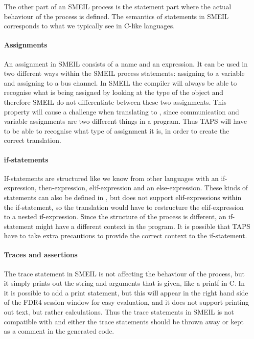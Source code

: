 The other part of an SMEIL process is the statement part where the actual behaviour of the process is defined. The semantics of statements in SMEIL corresponds to what we typically see in C-like languages.
\paragraph{Assignments}
An assignment in SMEIL consists of a name and an expression. It can be used in two different ways within the SMEIL process statements: assigning to a variable and assigning to a bus channel. In SMEIL the compiler will always be able to recognise what is being assigned by looking at the type of the object and therefore SMEIL do not differentiate between these two assignments.
This property will cause a challenge when translating to \cspm{}, since communication and variable assignments are two different things in a \cspm program. Thus TAPS will have to be able to recognise what type of assignment it is, in order to create the correct translation.
\paragraph{if-statements}
If-statements are structured like we know from other languages with an if-expression, then-expression, elif-expression and an else-expression.
These kinds of statements can also be defined in \cspm, but \cspm does not support elif-expressions within the if-statement, so the translation would have to restructure the elif-expression to a nested if-expression.
Since the structure of the \cspm process is different, an if-statement might have a different context in the \cspm program. It is possible that TAPS have to take extra precautions to provide the correct context to the if-statement.

\paragraph{Traces and assertions}
The trace statement in SMEIL is not affecting the behaviour of the process, but it simply prints out the string and arguments that is given, like a printf in C.
In \cspm it is possible to add a print statement, but this will appear in the right hand side of the FDR4 session window for easy evaluation, and it does not support printing out text, but rather calculations. Thus the trace statements in SMEIL is not compatible with \cspm and either the trace statements should be thrown away or kept as a comment in the generated code.\\

